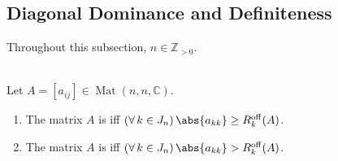 \subsection{Diagonal Dominance and Definiteness}

Throughout this subsection, $n\in\mathbb{Z}_{>0}$.

\begin{definition} \label{def:diagonal-dominance} \\
Let $A=[a_{ij}]\in\operatorname{Mat}(n,n,\mathbb{C})$.
\begin{enumerate}[label=(\roman*)]
\setlength{\itemsep}{0pt}
\item The matrix $A$ is  iff $(\forall\,k\in J_n)\,\abs{a_{kk}}\geq R_k^{\mathrm{off}}(A)$.
\item The matrix $A$ is  iff $(\forall\,k\in J_n)\,\abs{a_{kk}}>R_k^{\mathrm{off}}(A)$.
\end{enumerate}
\end{definition}

